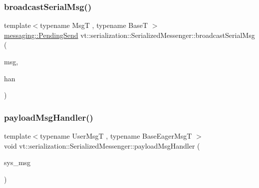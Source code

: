 \subsubsection{\texorpdfstring{broadcast\+Serial\+Msg()}{broadcastSerialMsg()}}
{\footnotesize\ttfamily template$<$typename MsgT , typename BaseT $>$ \\
\hyperlink{structvt_1_1messaging_1_1_pending_send}{messaging\+::\+Pending\+Send} vt\+::serialization\+::\+Serialized\+Messenger\+::broadcast\+Serial\+Msg (\begin{DoxyParamCaption}\item[{MsgT $\ast$}]{msg,  }\item[{\hyperlink{namespacevt_af64846b57dfcaf104da3ef6967917573}{Handler\+Type}}]{han }\end{DoxyParamCaption})\hspace{0.3cm}{\ttfamily [static]}}

\mbox{\label{structvt_1_1serialization_1_1_serialized_messenger_adef4a4664f9eab8eca28304871540791}} 
\subsubsection{\texorpdfstring{payload\+Msg\+Handler()}{payloadMsgHandler()}}
{\footnotesize\ttfamily template$<$typename User\+MsgT , typename Base\+Eager\+MsgT $>$ \\
void vt\+::serialization\+::\+Serialized\+Messenger\+::payload\+Msg\+Handler (\begin{DoxyParamCaption}\item[{\hyperlink{namespacevt_1_1serialization_af3a0dfd4a0d3fa09c75edba0dc1b7fec}{Serial\+Eager\+Payload\+Msg}$<$ User\+MsgT, Base\+Eager\+MsgT $>$ $\ast$}]{sys\+\_\+msg }\end{DoxyParamCaption})\hspace{0.3cm}{\ttfamily [static]}}

\mbox{\label{structvt_1_1serialization_1_1_serialized_messenger_a2e9c1f9f5c6923f8ad3467e62542f5ab}} 

